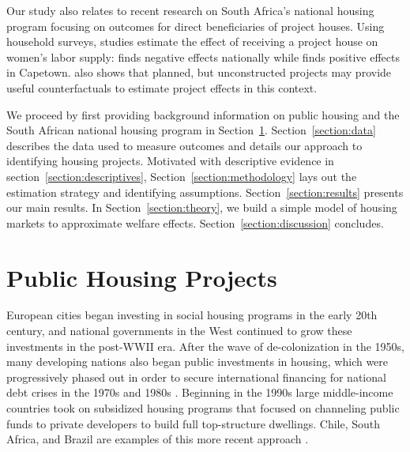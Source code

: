 \documentclass[12pt]{article}
\begin{document}
Our study also relates to recent research on South Africa's national housing program focusing on outcomes for direct beneficiaries of project houses.  Using household surveys, studies estimate the effect of receiving a project house on women's labor supply: \cite{picarelli2019there}  finds negative effects nationally while \cite{franklin2016enabled} finds positive effects in Capetown.  \cite{franklin2016enabled} also shows that planned, but unconstructed projects may provide useful counterfactuals to estimate project effects in this context.


We proceed by first providing background information on public housing and the South African national housing program in Section~\ref{section:background}.  Section~\ref{section:data} describes the data used to measure outcomes and details our approach to identifying housing projects. Motivated with descriptive evidence in section~\ref{section:descriptives}, Section~\ref{section:methodology} lays out the estimation strategy and identifying assumptions. Section~\ref{section:results} presents our main results.  In Section~\ref{section:theory}, we build a simple model of housing markets to approximate welfare effects.   Section~\ref{section:discussion} concludes.




\section{Public Housing Projects}\label{section:background}


European cities began investing in social housing programs in the early 20th century, and national governments in the West continued to grow these investments in the post-WWII era. After the wave of de-colonization in the 1950s, many developing nations also began public investments in housing, which were progressively phased out in order to secure international financing for national debt crises in the 1970s and 1980s \citep{rondinelli1990housing}. Beginning in the 1990s large middle-income countries took on subsidized housing programs that focused on channeling public funds to private developers to build full top-structure dwellings. Chile, South Africa, and Brazil are examples of this more recent approach \citep{buckley2005housing}.
\end{document}
